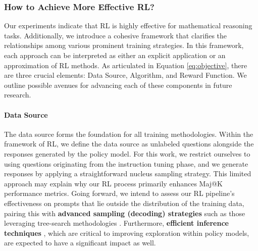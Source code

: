 \begin{itemize}[topsep=0pt]
\begin{itemize}[topsep=0pt]
\subsubsection{How to Achieve More Effective RL?}
\label{sec:effec_rl}
Our experiments indicate that RL is highly effective for mathematical reasoning tasks. Additionally, we introduce a cohesive framework that clarifies the relationships among various prominent training strategies. In this framework, each approach can be interpreted as either an explicit application or an approximation of RL methods. As articulated in Equation \ref{eq:objective}, there are three crucial elements: Data Source, Algorithm, and Reward Function. We outline possible avenues for advancing each of these components in future research.

\paragraph{Data Source} The data source forms the foundation for all training methodologies. Within the framework of RL, we define the data source as unlabeled questions alongside the responses generated by the policy model. For this work, we restrict ourselves to using questions originating from the instruction tuning phase, and we generate responses by applying a straightforward nucleus sampling strategy. This limited approach may explain why our RL process primarily enhances Maj@K performance metrics. Going forward, we intend to assess our RL pipeline’s effectiveness on prompts that lie outside the distribution of the training data, pairing this with \textbf{advanced sampling (decoding) strategies} such as those leveraging tree-search methodologies \citep{yao2023tree}. Furthermore, \textbf{efficient inference techniques} \citep{xia-etal-2023-speculative,leviathan2023fast,kwon2023efficient,xia2024unlocking}, which are critical to improving exploration within policy models, are expected to have a significant impact as well.


\end{itemize}
\end{itemize}
